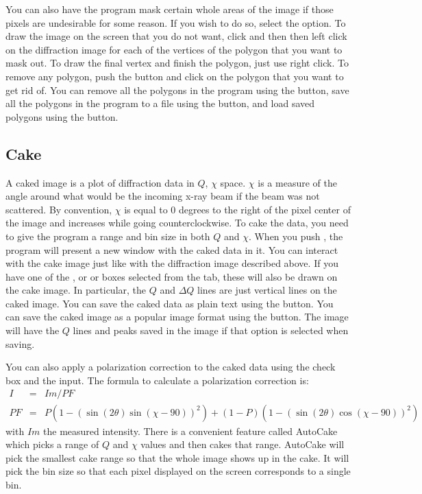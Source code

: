 You can also have the program mask certain whole areas 
of the image if those pixels are undesirable for some 
reason. If you wish to do so, select the 
 option. To draw the image on the
screen that you do not want, click  and
then then left click on the diffraction image for each 
of the vertices of the polygon that you want to mask out.
To draw the final vertex and finish the polygon, just
use right click. To remove any polygon, push the 
 button and click on the polygon that
you want to get rid of. You can remove all the polygons
in the program using the  button, save
all the polygons in the program to a file using the
 button, and load saved polygons using
the  button.

\subsection{Cake}

A caked image is a plot of diffraction data in $Q$, 
$\chi$ space. $\chi$ is a measure of the angle around 
what would be the incoming x-ray beam if the beam was 
not scattered. By convention, $\chi$ is equal to 0
degrees to the right of the pixel center of the image 
and increases while going counterclockwise. To cake the
data, you need to give the program a range and bin size 
in both $Q$ and $\chi$. When you push , the
program will present a new window with the caked data in
it. You can interact with the cake image just like with
the diffraction image described above. If you have one of
the , or  or 
 boxes selected from the  
tab, these will also be drawn on the cake image. In particular,
the $Q$ and $\Delta Q$ lines are just vertical lines on the
caked image. You can save the caked data as plain text 
using the  button. You can save the caked 
image as a popular image format using the 
button. The image will have the $Q$ lines and peaks saved
in the image if that option is selected when saving.

You can also apply a polarization correction to the caked
data using the  check box
and the  input. The formula to calculate a 
polarization correction is:
\begin{eqnarray}
    I&=&Im/PF \\ 
    PF&=&P(1 - (\sin(2\theta)\sin(\chi-90))^2) + 
    (1 - P)(1 - (\sin(2\theta)\cos(\chi-90))^2)
\end{eqnarray}
with $Im$ the measured intensity. There is a convenient
feature called AutoCake which picks a range of $Q$ and $\chi$ 
values and then cakes that range. AutoCake will pick the
smallest cake range so that the whole image shows up in
the cake. It will pick the bin size so that each pixel 
displayed on the screen corresponds to a single bin.

